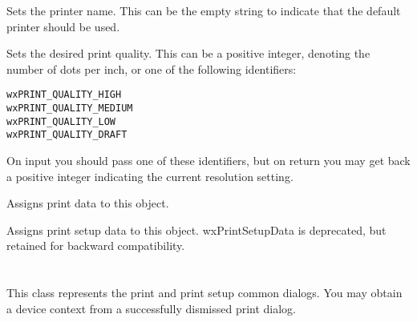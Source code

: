 \label{wxprintdatasetprintername}


Sets the printer name. This can be the empty string to indicate that the default
printer should be used.

\label{wxprintdatasetquality}


Sets the desired print quality. This can be a positive integer, denoting the number of dots per inch, or
one of the following identifiers:

\begin{verbatim}
wxPRINT_QUALITY_HIGH
wxPRINT_QUALITY_MEDIUM
wxPRINT_QUALITY_LOW
wxPRINT_QUALITY_DRAFT
\end{verbatim}

On input you should pass one of these identifiers, but on return you may get back a positive integer
indicating the current resolution setting.

\label{wxprintdataassign}


Assigns print data to this object.


Assigns print setup data to this object. wxPrintSetupData is deprecated,
but retained for backward compatibility.

\section{}\label{wxprintdialog}

This class represents the print and print setup common dialogs.
You may obtain a  device context from
a successfully dismissed print dialog.


\\
\\
\\


